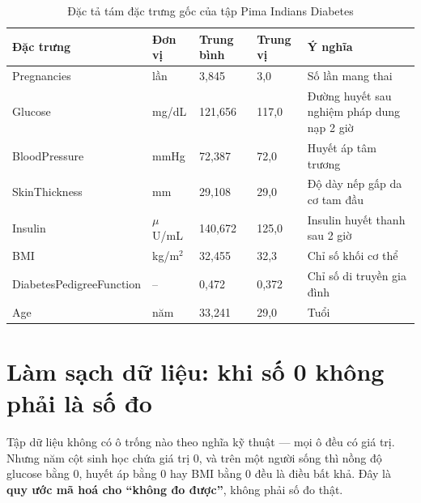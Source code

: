 \begin{table}[H]
\centering
\caption{Đặc tả tám đặc trưng gốc của tập Pima Indians Diabetes}
\label{tab:dactrung-dia}
\small
\begin{tabularx}{\textwidth}{@{}L{3.5cm}L{1.6cm}R{1.5cm}R{1.5cm}X@{}}
\toprule
\textbf{Đặc trưng} & \textbf{Đơn vị} & \textbf{Trung bình} & \textbf{Trung vị} & \textbf{Ý nghĩa} \\
\midrule
Pregnancies              & lần   & 3{,}845   & 3{,}0   & Số lần mang thai \\
Glucose                  & mg/dL & 121{,}656 & 117{,}0 & Đường huyết sau nghiệm pháp dung nạp 2 giờ \\
BloodPressure            & mmHg  & 72{,}387  & 72{,}0  & Huyết áp tâm trương \\
SkinThickness            & mm    & 29{,}108  & 29{,}0  & Độ dày nếp gấp da cơ tam đầu \\
Insulin                  & $\mu$U/mL & 140{,}672 & 125{,}0 & Insulin huyết thanh sau 2 giờ \\
BMI                      & kg/m$^2$ & 32{,}455 & 32{,}3 & Chỉ số khối cơ thể \\
DiabetesPedigreeFunction & --    & 0{,}472   & 0{,}372 & Chỉ số di truyền gia đình \\
Age                      & năm   & 33{,}241  & 29{,}0  & Tuổi \\
\bottomrule
\end{tabularx}
\end{table}


\section{Làm sạch dữ liệu: khi số 0 không phải là số đo}
\label{sec:lamsach-dia}

Tập dữ liệu không có ô trống nào theo nghĩa kỹ thuật --- mọi ô đều có giá trị.
Nhưng năm cột sinh học chứa giá trị $0$, và trên một người sống thì nồng độ
glucose bằng $0$, huyết áp bằng $0$ hay BMI bằng $0$ đều là điều bất khả. Đây
là \textbf{quy ước mã hoá cho ``không đo được''}, không phải số đo thật.

